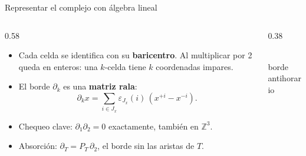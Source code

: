 \documentclass[aspectratio=169,11pt]{beamer}
\newcommand{\Z}{\mathbb{Z}}
\begin{document}
\begin{frame}{Representar el complejo con álgebra lineal}
  \begin{columns}[c]
    \begin{column}{0.58\textwidth}
      \begin{itemize}
        \item Cada celda se identifica con su \textbf{baricentro}. Al multiplicar por 2 queda en enteros: una $k$-celda tiene $k$ coordenadas impares.
        \item El borde $\partial_k$ es una \textbf{matriz rala}:
        \[
          \partial_kx=\sum_{i\in J_x}\varepsilon_{J_x}(i)\,(x^{+i}-x^{-i}).
        \]
        \item Chequeo clave: $\partial_1\partial_2=0$ exactamente, también en $\Z^3$.
        \item Absorción: $\partial_T=P_T\,\partial_2$, el borde sin las aristas de $T$.
      \end{itemize}
    \end{column}
    \begin{column}{0.38\textwidth}
      \centering
      \\[2mm]{\scriptsize borde antihorario}
    \end{column}
  \end{columns}
\end{frame}
\end{document}
